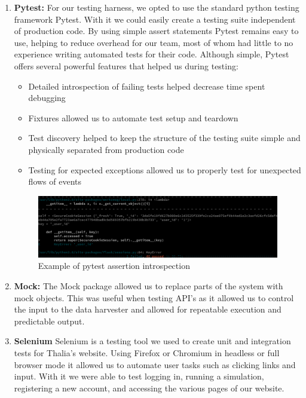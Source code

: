 \documentclass[main.tex]{subfiles}
\begin{document}
\begin{enumerate}
\item \textbf{Pytest:}
For our testing harness, we opted to use the standard python testing framework Pytest. With it we could easily create a testing suite independent of production code. By using simple assert statements Pytest remains easy to use, helping to reduce overhead for our team, most of whom had little to no experience writing automated tests for their code. Although simple, Pytest offers several powerful features that helped us during testing:

\begin{itemize}
\item Detailed introspection of failing tests helped decrease time spent debugging
\item Fixtures allowed us to automate test setup and teardown
\item Test discovery helped to keep the structure of the testing suite simple and physically separated from production code
\item Testing for expected exceptions allowed us to properly test for unexpected flows of events
\end{itemize}


\begin{figure}[H]
   \centering
   \includegraphics[scale=0.3]{07Testing/06Pictures/failedTest.png}
   \caption{Example of pytest assertion introspection}
   \label{Pytest example}
\end{figure}

\item \textbf{Mock:}
The Mock\cite{mock} package allowed us to replace parts of the system with mock objects. This was useful when testing API’s as it allowed us to control the input to the data harvester and allowed for repeatable execution and predictable output.

\item \textbf{Selenium}
Selenium\cite{selenium} is a testing tool we used to create unit and integration tests for Thalia’s website. Using Firefox or Chromium in headless or full browser mode it allowed us to automate user tasks such as clicking links and input. With it we were able to test logging in, running a simulation, registering a new account, and accessing the various pages of our website.


\end{enumerate}
\end{document}
